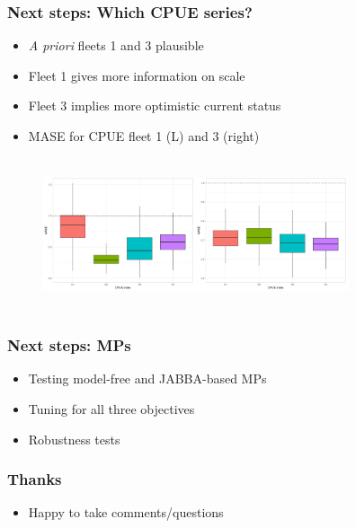 \documentclass{beamer}
\begin{document}
\begin{frame}
    \frametitle{Next steps: Which CPUE series?}
\begin{itemize}
    \item \textit{A priori} fleets 1 and 3 plausible
    \item Fleet 1 gives more information on scale
    \item Fleet 3 implies more optimistic current status
    \item MASE for CPUE fleet 1 (L) and 3 (right)
\end{itemize}
    \begin{figure}
    \begin{center}   
        \includegraphics[width=4.5cm,height=4.5cm]{figs/mase/r5bmase.png}\includegraphics[width=4.5cm,height=4.5cm]{figs/mase/r5amase.png}
    \end{center}
    \end{figure}
\end{frame}

\begin{frame}
    \frametitle{Next steps: MPs}
\begin{itemize}
    \item Testing model-free and JABBA-based MPs
    \item Tuning for all three objectives
    \item Robustness tests
\end{itemize}
\end{frame}

\begin{frame}
    \frametitle{Thanks}
\begin{itemize}
    \item Happy to take comments/questions
\end{itemize}
\end{frame}

\end{document}
